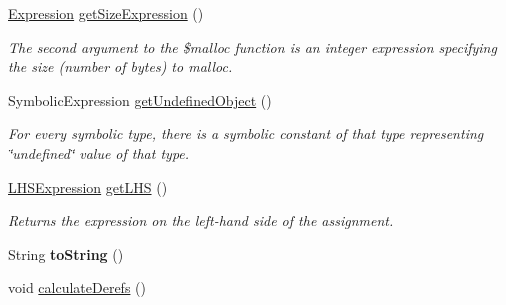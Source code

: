 \begin{DoxyCompactItemize}
\hyperlink{interfaceedu_1_1udel_1_1cis_1_1vsl_1_1civl_1_1model_1_1IF_1_1expression_1_1Expression}{Expression} \hyperlink{classedu_1_1udel_1_1cis_1_1vsl_1_1civl_1_1model_1_1common_1_1statement_1_1CommonMallocStatement_add74b5c088aebe654d694a797001df3a}{get\+Size\+Expression} ()
\begin{DoxyCompactList}\small\item\em The second argument to the \$malloc function is an integer expression specifying the size (number of bytes) to malloc. \end{DoxyCompactList}\item 
Symbolic\+Expression \hyperlink{classedu_1_1udel_1_1cis_1_1vsl_1_1civl_1_1model_1_1common_1_1statement_1_1CommonMallocStatement_af14d4be2f9162433802ac993a8a135b1}{get\+Undefined\+Object} ()
\begin{DoxyCompactList}\small\item\em For every symbolic type, there is a symbolic constant of that type representing \char`\"{}undefined\char`\"{} value of that type. \end{DoxyCompactList}\item 
\hyperlink{interfaceedu_1_1udel_1_1cis_1_1vsl_1_1civl_1_1model_1_1IF_1_1expression_1_1LHSExpression}{L\+H\+S\+Expression} \hyperlink{classedu_1_1udel_1_1cis_1_1vsl_1_1civl_1_1model_1_1common_1_1statement_1_1CommonMallocStatement_a0b4a12ff2b0693bb2f8145e856e2f62b}{get\+L\+H\+S} ()
\begin{DoxyCompactList}\small\item\em Returns the expression on the left-\/hand side of the assignment. \end{DoxyCompactList}\item 
\hypertarget{classedu_1_1udel_1_1cis_1_1vsl_1_1civl_1_1model_1_1common_1_1statement_1_1CommonMallocStatement_a49642faf7b94ad6dd043445aeccf5260}{}String {\bfseries to\+String} ()\label{classedu_1_1udel_1_1cis_1_1vsl_1_1civl_1_1model_1_1common_1_1statement_1_1CommonMallocStatement_a49642faf7b94ad6dd043445aeccf5260}

\item 
\hypertarget{classedu_1_1udel_1_1cis_1_1vsl_1_1civl_1_1model_1_1common_1_1statement_1_1CommonMallocStatement_aa9d0e074c9f03784ef6d6e7ee05f3062}{}void \hyperlink{classedu_1_1udel_1_1cis_1_1vsl_1_1civl_1_1model_1_1common_1_1statement_1_1CommonMallocStatement_aa9d0e074c9f03784ef6d6e7ee05f3062}{calculate\+Derefs} ()\label{classedu_1_1udel_1_1cis_1_1vsl_1_1civl_1_1model_1_1common_1_1statement_1_1CommonMallocStatement_aa9d0e074c9f03784ef6d6e7ee05f3062}


\end{DoxyCompactItemize}
